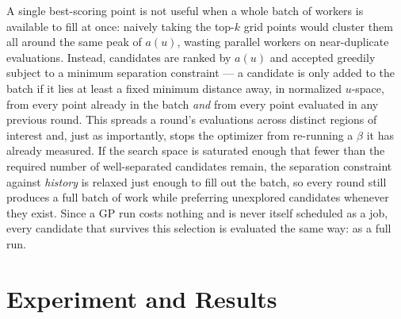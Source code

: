 \documentclass[11pt]{article}
\begin{document}
A single best-scoring point is not useful when a whole batch of workers
is available to fill at once: naively taking the top-$k$ grid points
would cluster them all around the same peak of $a(u)$, wasting parallel
workers on near-duplicate evaluations. Instead, candidates are ranked by
$a(u)$ and accepted greedily subject to a minimum separation constraint —
a candidate is only added to the batch if it lies at least a fixed
minimum distance away, in normalized $u$-space, from every point already
in the batch \emph{and} from every point evaluated in any previous round.
This spreads a round's evaluations across distinct regions of interest
and, just as importantly, stops the optimizer from re-running a $\beta$
it has already measured. If the search space is saturated enough that
fewer than the required number of well-separated candidates remain, the
separation constraint against \emph{history} is relaxed just enough to
fill out the batch, so every round still produces a full batch of work
while preferring unexplored candidates whenever they exist. Since a GP
run costs nothing and is never itself scheduled as a job, every candidate
that survives this selection is evaluated the same way: as a full run.

\section{Experiment and Results}
\label{sec:experiments}
\end{document}
